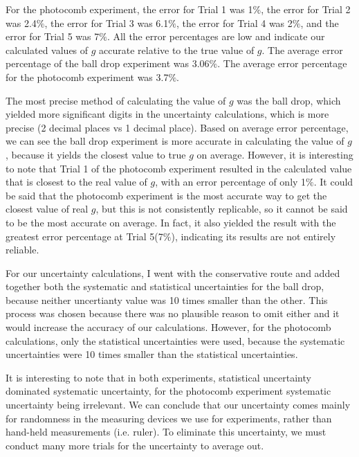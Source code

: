 \documentclass[11pt]{report}
\begin{document}
\setlength{\parindent}{5ex}
For the photocomb experiment, the error for Trial 1 was 1$\%$, the error for Trial 2 was
2.4$\%$, the error for Trial 3 was 6.1$\%$, the error for Trial 4 was 2$\%$, and
the error for Trial 5 was 7$\%$.  All the error percentages are low and indicate
our calculated values of \(g\) accurate relative to the true value of \(g\).
The average error percentage of the ball drop experiment was 3.06$\%$.  The
average error percentage for the photocomb experiment was 3.7$\%$.  

The most precise method of calculating the value of \(g\) was the ball drop,
which yielded more significant digits in the uncertainty calculations, which is
more precise (2 decimal places vs 1 decimal place).  
Based on average error percentage, we can see the ball 
drop experiment is more accurate in calculating the value of \(g\), because it
yields the closest value to true \(g\) on average.  However, it is interesting
to note that Trial 1 of the photocomb experiment resulted in the calculated value
that is closest to the real value of \(g\), with an error percentage of only 1$\%$. 
It could be said that the photocomb experiment is the most accurate way to get the closest
value of real \(g\), but this is not consistently replicable, so it cannot be said to
be the most accurate on average.  In fact, it also yielded the result with the greatest
error percentage at Trial 5(7$\%$), indicating its results are not entirely
reliable.  

For our uncertainty calculations, I went with the conservative route and added
together both the systematic and statistical uncertainties for the ball drop, 
because neither uncertianty value was 10 times smaller than the other.  This
process was chosen because there was no plausible reason to omit either and it
would increase the accuracy of our calculations. However, for the photocomb 
calculations, only the statistical uncertainties were used, because the 
systematic uncertainties were 10 times smaller than the statistical uncertainties.  

It is interesting to note that in both experiments, statistical uncertainty
dominated systematic uncertainty, for the photocomb experiment systematic
uncertainty being irrelevant.  We can conclude that our uncertainty comes mainly
for randomness in the measuring devices we use for experiments, rather than
hand-held measurements (i.e. ruler).  To eliminate this uncertainty, we must
conduct many more trials for the uncertainty to average out.
\end{document}
